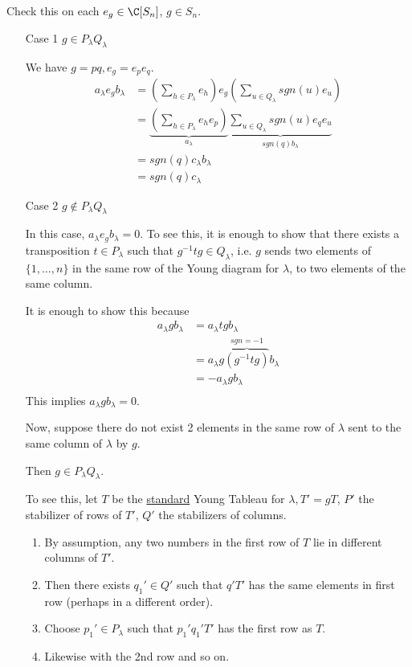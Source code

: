 \documentclass[x11names,reqno,14pt]{extarticle}
\begin{document}
Check this on each $e_g \in \C[S_n]$, $g \in S_n$. 
\begin{enumerate}

\item[Case 1] $g \in P_\lambda Q_\lambda$

We have $g = pq, e_g = e_pe_q$. 
\begin{align*}
a_\lambda e_g b_\lambda & = \left(\sum_{h \in P_\lambda}e_h\right) e_g \left(\sum_{u\in Q_\lambda}sgn(u)e_u\right) \\
& = \underbrace{\left(\sum_{h\in P_\lambda}e_he_p\right)}_{a_\lambda}\underbrace{\sum_{u\in Q_\lambda}sgn(u)e_qe_u}_{sgn(q)b_\lambda} \\
& = sgn(q)c_\lambda b_\lambda \\
& = sgn(q)c_\lambda
\end{align*}

\item[Case 2] $g \not\in P_\lambda Q_\lambda$

In this case, $a_\lambda e_g b_\lambda = 0$. To see this, it is enough to show that there exists a transposition $t \in P_\lambda$ such that $g^{-1}tg \in Q_\lambda$, i.e.  $g$ sends two elements of $\{1, \dots, n\}$ in the same row of the Young diagram for $\lambda$, to two elements of the same column. 

It is enough to show this because
\begin{align*}
a_\lambda gb_\lambda & = a_\lambda t g b_\lambda \\
& = a_\lambda g\overbrace{(g^{-1}tg)}^{sgn = -1}b_\lambda \\
& = -a_\lambda g b_\lambda \\
\end{align*}
This implies $a_\lambda gb_\lambda = 0$.

Now, suppose there do not exist 2 elements in the same row of $\lambda$ sent to the same column of $\lambda$ by $g$. 

Then $g \in P_\lambda Q_\lambda$.

To see this, let $T$ be the \underline{standard} Young Tableau for $\lambda,T' = gT$, $P'$ the stabilizer of rows of $T'$, $Q'$ the stabilizers of columns. 

\begin{enumerate}[label=(\roman*)]

\item By assumption, any two numbers in the first row of $T$ lie in different columns of $T'$.

\item Then there exists $q_1' \in Q'$ such that $q'T'$ has the same elements in first row (perhaps in a different order). 

\item Choose $p_1' \in P_\lambda$ such that $p_1'q_1'T'$ has the first row as $T$.

\item Likewise with the 2nd row and so on. 

\end{enumerate}


\end{enumerate}
\end{document}
